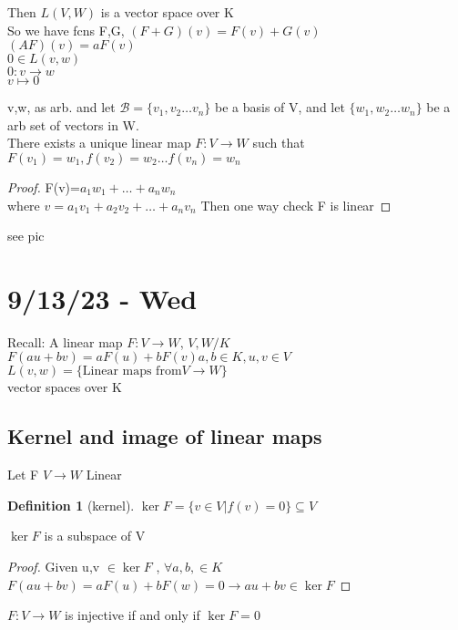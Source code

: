 \documentclass{article}
\newtheorem*{definition}{Definition}
\newcommand{\vs}{v_1,v_2\dots v_n}
\newcommand{\ws}{w_1,w_2\dots w_n}
\newcommand{\brac}[1]{\{#1\}}
\newcommand{\lincom}{a_1v_1+a_2v_2+\dots+a_nv_n}
\newenvironment{lemma}[2][Lemma]{\begin{trivlist}
\item[\hskip \labelsep {\bfseries #1}\hskip \labelsep {\bfseries #2.}]}{\end{trivlist}}
\begin{document}
Then $L(V,W)$ is a vector space over K\\
So we have fcns F,G, $(F+G)(v)=F(v)+G(v)$\\$(AF)(v)=aF(v)$\\
$0\in L(v,w)$\\
$0: v \to w$
\\$v \mapsto 0$\\
\begin{theorem}
    v,w, as arb. and let $\mathcal{B}=\brac{\vs}$ be a basis of V, and let $\brac{\ws}$ be a arb set of vectors in W.\\
    There exists a unique linear map $F:V\to W$ such that $F(v_1)=w_1,f(v_2)=w_2\dots f(v_n)=w_n$\\
    
\end{theorem}
\begin{proof}
    F(v)=$a_1w_1+\dots+a_nw_n$\\where $v=\lincom$
    Then one way check F is linear
    
\end{proof}
see pic

\section{9/13/23 - Wed}
Recall:
A linear map
$F:V \to W$, $V,W /K$
\\$F(au+bv)=aF(u)+bF(v) a,b \in K, u,v \in V$
\\$L(v,w)=\brac{\text{Linear maps from}V \to W}$
\\vector spaces over K

\subsection{Kernel and image of linear maps}
Let F $V \to W$ Linear\\
\begin{definition}
    [kernel] $\ker F=\brac{v\in V|f(v)=0}\subseteq V$
\end{definition}
\begin{lemma}{}
    $\ker F$ is a subspace of V
\end{lemma}
\begin{proof}
    Given u,v $\in \ker F$ , $\forall a,b,\in K$
    $F(au+bv)=aF(u)+bF(w)=0\to au+bv\in\ker F$
\end{proof}
\begin{lemma}{}
    $F:V \to W$ is injective if and only if $\ker F=0$
    
\end{lemma}
\end{document}
